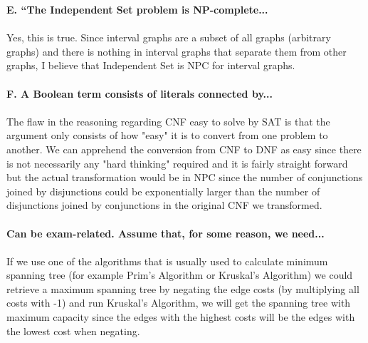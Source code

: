 \documentclass[12pt,oneside,reqno]{amsart}
\begin{document}
\textbf{E. “The Independent Set problem is NP-complete...}\\\\
Yes, this is true. Since interval graphs are a subset of all graphs (arbitrary graphs) and there is nothing in interval graphs that separate them from other graphs, I believe that Independent Set is NPC for interval graphs.\\\\

\textbf{F. A Boolean term consists of literals connected by...}\\\\
The flaw in the reasoning regarding CNF easy to solve by SAT is that the argument only consists of how "easy" it is to convert from one problem to another. We can apprehend the conversion from CNF to DNF as easy since there is not necessarily any "hard thinking" required and it is fairly straight forward but the actual transformation would be in NPC since the number of conjunctions joined by disjunctions could be exponentially larger than the number of disjunctions joined by conjunctions in the original CNF we transformed.\\\\

\textbf{Can be exam-related. Assume that, for some reason, we need...}\\\\
If we use one of the algorithms that is usually used to calculate minimum spanning tree (for example Prim's Algorithm or Kruskal's Algorithm) we could retrieve a maximum spanning tree by negating the edge costs (by multiplying all costs with -1) and run Kruskal's Algorithm, we will get the spanning tree with maximum capacity since the edges with the highest costs will be the edges with the lowest cost when negating. 
\end{document}
